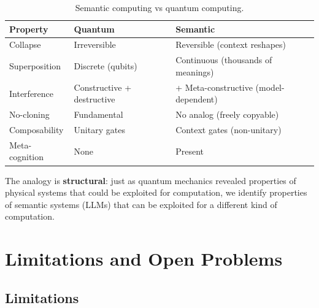 \documentclass[11pt,a4paper]{article}
\begin{document}
\begin{table}[H]
\centering
\caption{Semantic computing vs quantum computing.}
\begin{tabular}{lll}
\toprule
\textbf{Property} & \textbf{Quantum} & \textbf{Semantic} \\
\midrule
Collapse        & Irreversible       & Reversible (context reshapes) \\
Superposition   & Discrete (qubits)  & Continuous (thousands of meanings) \\
Interference    & Constructive + destructive & + Meta-constructive (model-dependent) \\
No-cloning      & Fundamental        & No analog (freely copyable) \\
Composability   & Unitary gates      & Context gates (non-unitary) \\
Meta-cognition  & None               & Present \\
\bottomrule
\end{tabular}
\label{tab:quantum-diff}
\end{table}

The analogy is \textbf{structural}: just as quantum mechanics revealed properties of physical systems that could be exploited for computation, we identify properties of semantic systems (LLMs) that can be exploited for a different kind of computation.

\section{Limitations and Open Problems}

\subsection{Limitations}
\end{document}
